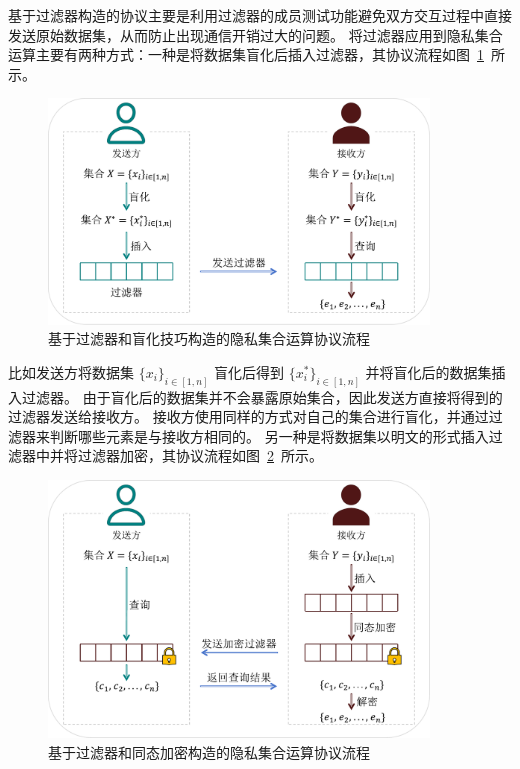 基于过滤器构造的协议主要是利用过滤器的成员测试功能避免双方交互过程中直接发送原始数据集，从而防止出现通信开销过大的问题。
将过滤器应用到隐私集合运算主要有两种方式：一种是将数据集盲化后插入过滤器，其协议流程如图~\ref{fig:pso_ft1}~所示。
\begin{figure}[ht]
  \centering
  \includegraphics[width=0.9\textwidth]{figures/pso_ft1.pdf}
  \caption{基于过滤器和盲化技巧构造的隐私集合运算协议流程}
  \label{fig:pso_ft1}
\end{figure}
比如发送方将数据集 $\{x_i\}_{i\in[1,n]}$ 盲化后得到 $\{x^*_i\}_{i\in[1,n]}$ 并将盲化后的数据集插入过滤器。
由于盲化后的数据集并不会暴露原始集合，因此发送方直接将得到的过滤器发送给接收方。
接收方使用同样的方式对自己的集合进行盲化，并通过过滤器来判断哪些元素是与接收方相同的。
另一种是将数据集以明文的形式插入过滤器中并将过滤器加密，其协议流程如图~\ref{fig:pso_ft2}~所示。
\begin{figure}[ht]
  \centering
  \includegraphics[width=0.9\textwidth]{figures/pso_ft2.pdf}
  \caption{基于过滤器和同态加密构造的隐私集合运算协议流程}
  \label{fig:pso_ft2}
\end{figure}
